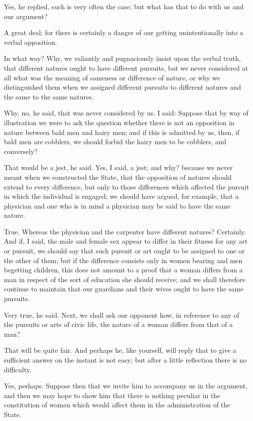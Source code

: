 Yes, he replied, such is very often the case; but what has that to do with us and our argument?

A great deal; for there is certainly a danger of our getting unintentionally into a verbal opposition.

In what way?
Why, we valiantly and pugnaciously insist upon the verbal truth, that different natures ought to have different pursuits, but we never considered at all what was the meaning of sameness or difference of nature, or why we distinguished them when we assigned different pursuits to different natures and the same to the same natures.

Why, no, he said, that was never considered by us.
I said: Suppose that by way of illustration we were to ask the question whether there is not an opposition in nature between bald men and hairy men; and if this is admitted by us, then, if bald men are cobblers, we should forbid the hairy men to be cobblers, and conversely?

That would be a jest, he said.
Yes, I said, a jest; and why? because we never meant when we constructed the State, that the opposition of natures should extend to every difference, but only to those differences which affected the pursuit in which the individual is engaged; we should have argued, for example, that a physician and one who is in mind a physician may be said to have the same nature.

True.
Whereas the physician and the carpenter have different natures?
Certainly.
And if, I said, the male and female sex appear to differ in their fitness for any art or pursuit, we should say that such pursuit or art ought to be assigned to one or the other of them; but if the difference consists only in women bearing and men begetting children, this does not amount to a proof that a woman differs from a man in respect of the sort of education she should receive; and we shall therefore continue to maintain that our guardians and their wives ought to have the same pursuits.

Very true, he said.
Next, we shall ask our opponent how, in reference to any of the pursuits or arts of civic life, the nature of a woman differs from that of a man?

That will be quite fair.
And perhaps he, like yourself, will reply that to give a sufficient answer on the instant is not easy; but after a little reflection there is no difficulty.

Yes, perhaps.
Suppose then that we invite him to accompany us in the argument, and then we may hope to show him that there is nothing peculiar in the constitution of women which would affect them in the administration of the State.

